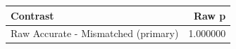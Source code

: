 \begin{tabular}{lr}
\toprule
Contrast & Raw p \\
\midrule
Raw Accurate - Mismatched (primary) & 1.000000 \\
\bottomrule
\end{tabular}
